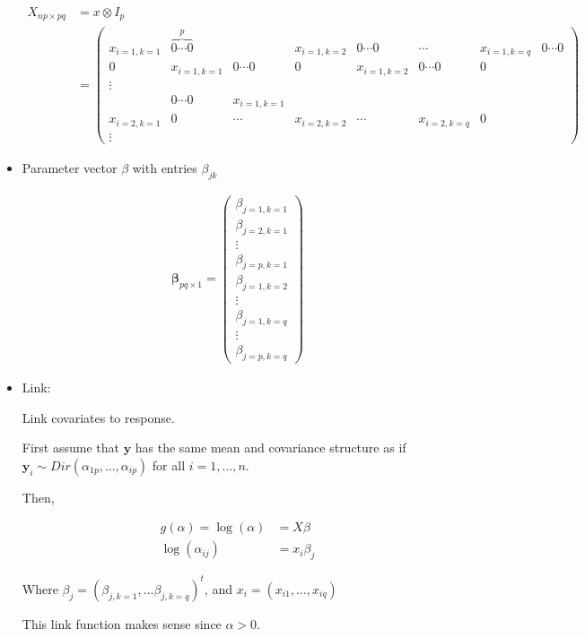 \documentclass[10pt]{article}
\theoremstyle{definition}
\begin{document}
\begin{itemize}
   \begin{align*}
     X_{np \times pq} &= x \otimes I_p\\
     &= \begin{pmatrix} x_{i = 1, k = 1} & \overbrace{0 \cdots  0}^p &   & x_{i = 1, k = 2} & 0  \cdots  0 & \cdots &  x_{i = 1, k = q} & 0 \cdots 0  \\
    0 & x_{i = 1, k = 1}  & 0 \cdots 0 & 0 &  x_{i = 1, k = 2} & 0 \cdots 0 & 0 & \\
    \vdots \\
    & 0 \cdots 0 & x_{i = 1, k = 1} \\
     x_{i = 2, k = 1} & 0 & \cdots & x_{i = 2, k = 2} & \cdots & x_{i = 2, k = q} & 0 \\
   \vdots  \end{pmatrix}
   \end{align*}


   \item Parameter vector $\beta$ with entries $\beta_{jk}$

   \begin{align*}
     \boldsymbol\beta_{pq \times 1} = \begin{pmatrix}
     \beta_{j = 1, k = 1}\\
     \beta_{j = 2, k = 1} \\\vdots \\
     \beta_{j = p, k = 1} \\
     \beta_{j = 1, k = 2} \\ \vdots \\
     \beta_{j = 1, k = q} \\ \vdots \\
     \beta_{j = p, k = q}
   \end{pmatrix}
   \end{align*}


   \item Link:

   Link covariates to response.

   First assume that $\textbf{y}$ has the same mean and covariance structure as if $\textbf{y}_i \sim Dir(\alpha_{1p}, \ldots , \alpha_{ip})$ for all $i = 1, \ldots, n$.

   Then,

   \begin{align*}
     g(\alpha) = \log(\alpha) &= X \beta \\
     \log(\alpha_{ij}) &= x_{i} \beta_{j}
   \end{align*}

Where $\beta_j = (\beta_{j, k = 1}, \ldots \beta_{j, k = q})^t$, and $x_i = (x_{i1}, \ldots , x_{iq})$

This link function makes sense since $\alpha > 0$.

\end{itemize}
\end{document}

